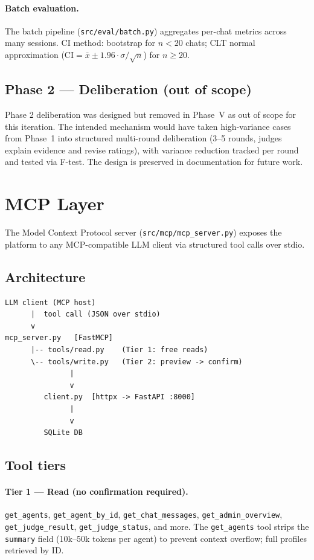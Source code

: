 \documentclass[12pt,a4paper]{article}
\begin{document}
\paragraph{Batch evaluation.}
The batch pipeline (\texttt{src/eval/batch.py}) aggregates per-chat metrics across many sessions.
CI method: bootstrap for $n < 20$ chats; CLT normal approximation
($\text{CI} = \bar{x} \pm 1.96 \cdot \sigma / \sqrt{n}$) for $n \geq 20$.

\subsection{Phase 2 --- Deliberation (out of scope)}

Phase 2 deliberation was designed but removed in Phase~V as out of scope for this
iteration. The intended mechanism would have taken high-variance cases from Phase~1 into
structured multi-round deliberation (3--5 rounds, judges explain evidence and revise
ratings), with variance reduction tracked per round and tested via F-test. The design is
preserved in documentation for future work.

\section{MCP Layer}

The Model Context Protocol server (\texttt{src/mcp/mcp\_server.py}) exposes the platform
to any MCP-compatible LLM client via structured tool calls over stdio.

\subsection{Architecture}

\begin{lstlisting}[numbers=none,frame=single]
LLM client (MCP host)
      |  tool call (JSON over stdio)
      v
mcp_server.py   [FastMCP]
      |-- tools/read.py    (Tier 1: free reads)
      \-- tools/write.py   (Tier 2: preview -> confirm)
               |
               v
         client.py  [httpx -> FastAPI :8000]
               |
               v
         SQLite DB
\end{lstlisting}

\subsection{Tool tiers}

\paragraph{Tier 1 --- Read (no confirmation required).}
\texttt{get\_agents}, \texttt{get\_agent\_by\_id}, \texttt{get\_chat\_messages},
\texttt{get\_admin\_overview}, \texttt{get\_judge\_result}, \texttt{get\_judge\_status},
and more. The \texttt{get\_agents} tool strips the \texttt{summary} field (10k--50k tokens
per agent) to prevent context overflow; full profiles retrieved by ID.
\end{document}
